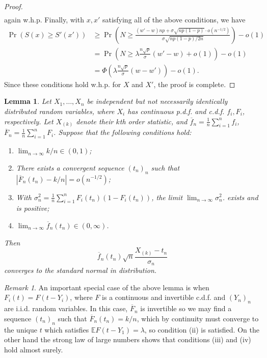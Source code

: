 \documentclass{article}
\newtheorem{lemma}[theorem]{Lemma}
\theoremstyle{remark}
\newtheorem*{remark}{Remark}
\newcommand{\E}{\mathbb{E}}
\newcommand{\1}{\mathbbm{1}}
\begin{document}
\begin{proof}
\begin{align*}
    \end{align*}
    again w.h.p.
    Finally, with $x, x'$ satisfying all of the above conditions, we have
    \begin{align*}
        \Pr(S(x) \ge S'(x')) &\ge \Pr\left(N \ge \frac{(w' - w)np + \sigma \sqrt{np(1-p)} \cdot o(n^{-1/2})}{\sigma \sqrt{np(1-p) / 2n}} \right) - o(1)\\
        &= \Pr(N \ge \lambda \frac{n\sqrt{p}}{\sigma} (w' - w) + o(1)) - o(1)\\
        &= \Phi\left(\lambda \frac{n\sqrt{p}}{\sigma} (w - w')\right) - o(1).
    \end{align*}
    Since these conditions hold w.h.p. for $X$ and $X'$, the proof is complete.
\end{proof}

\begin{lemma} \label{lemma:order}
    Let $X_1,\ldots, X_n$ be independent but not necessarily identically distributed random variables, where $X_i$ has continuous p.d.f. and c.d.f. $f_i, F_i$, respectively. Let $X_{(k)}$ denote their $k$th order statistic, and $\overline f_n = \frac{1}{n} \sum_{i=1}^n f_i$, $\overline F_n = \frac{1}{n} \sum_{i=1}^n F_i$. Suppose that the following conditions hold:
    \begin{enumerate}[label=(\roman*)]
        \item $\lim_{n \to\infty} k / n \in (0, 1)$;
        \item There exists a convergent sequence $(t_n)_n$ such that $|\overline F_n(t_n) - k/n| = o(n^{-1/2})$;
        \item With $\sigma_n^2 = \frac{1}{n}\sum_{i=1}^n F_i(t_n) (1 - F_i(t_n))$, the limit $\lim_{n \to \infty} \sigma_n^2$. exists and is positive;
        \item $\lim_{n \to \infty} \overline f_n(t_n) \in (0, \infty)$.
    \end{enumerate}
    Then \[\overline f_n(t_n) \sqrt{n} \frac{X_{(k)} - t_n}{\sigma_n}\] converges to the standard normal in distribution.
\end{lemma}
\begin{remark} \label{remark:order}
    An important special case of the above lemma is when $F_i(t) = F(t - Y_i)$, where $F$ is a continuous and invertible c.d.f. and $(Y_n)_n$ are i.i.d. random variables. In this case, $\overline F_n$ is invertible so we may find a sequence $(t_n)_n$ such that $\overline F_n(t_n) = k/n$, which by continuity must converge to the unique $t$ which satisfies $\E F(t - Y_1) = \lambda$, so condition (ii) is satisfied. On the other hand the strong law of large numbers shows that conditions (iii) and (iv) hold almost surely.
\end{remark}
\end{document}
